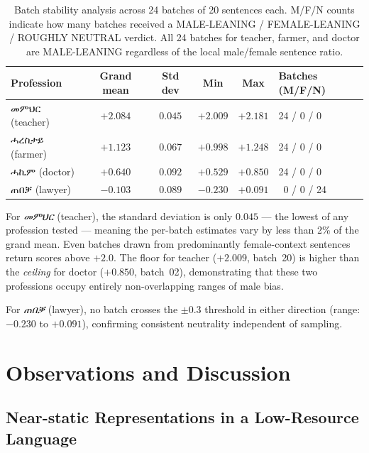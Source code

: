 \begin{table}[h]
\centering
\small
\begin{tabular}{lccccl}
\toprule
\textbf{Profession} & \textbf{Grand mean} & \textbf{Std dev} & \textbf{Min} & \textbf{Max} & \textbf{Batches (M/F/N)} \\
\midrule
መምህር  (teacher)  & $+2.084$ & $0.045$ & $+2.009$ & $+2.181$ & 24 / 0 / 0 \\
ሓረስታይ (farmer)  & $+1.123$ & $0.067$ & $+0.998$ & $+1.248$ & 24 / 0 / 0 \\
ሓኪም   (doctor)  & $+0.640$ & $0.092$ & $+0.529$ & $+0.850$ & 24 / 0 / 0 \\
ጠበቓ   (lawyer)  & $-0.103$ & $0.089$ & $-0.230$ & $+0.091$ & ~0 / 0 / 24 \\
\bottomrule
\end{tabular}
\caption{Batch stability analysis across 24 batches of 20 sentences each.
M/F/N counts indicate how many batches received a MALE-LEANING / FEMALE-LEANING
/ ROUGHLY NEUTRAL verdict. All 24 batches for teacher, farmer, and doctor
are MALE-LEANING regardless of the local male/female sentence ratio.}
\label{tab:batch_stability}
\end{table}

For \textit{መምህር} (teacher), the standard deviation is only $0.045$ — the
lowest of any profession tested — meaning the per-batch estimates vary by less
than 2\% of the grand mean. Even batches drawn from predominantly female-context
sentences return scores above $+2.0$. The floor for teacher ($+2.009$, batch~20)
is higher than the \emph{ceiling} for doctor ($+0.850$, batch~02), demonstrating
that these two professions occupy entirely non-overlapping ranges of male bias.

For \textit{ጠበቓ} (lawyer), no batch crosses the $\pm 0.3$ threshold in
either direction (range: $-0.230$ to $+0.091$), confirming consistent
neutrality independent of sampling.


\section{Observations and Discussion}

\subsection{Near-static Representations in a Low-Resource Language}

